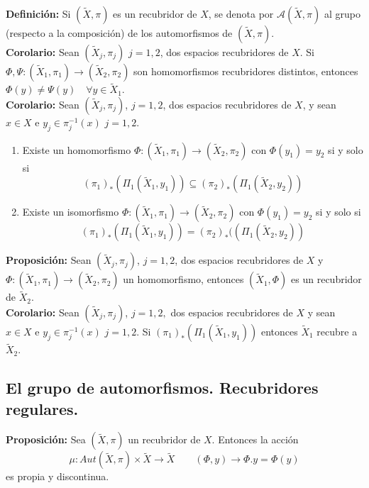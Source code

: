 \documentclass{article}
\begin{document}
\textbf{Definición:} Si $(\tilde{X},\pi)$ es un recubridor de $X$, se denota por $\mathcal{A}(\tilde{X},\pi)$ al grupo (respecto a la composición) de los automorfismos de $(\tilde{X},\pi)$.\\

\textbf{Corolario:} Sean $(\tilde{X}_j,\pi_j)$ $j=1,2$, dos espacios recubridores de $X$. Si $\Phi,\Psi:(\tilde{X}_1,\pi_1)\rightarrow (\tilde{X}_2,\pi_2)$ son homomorfismos recubridores distintos, entonces $\Phi(y)\neq \Psi(y)\quad \forall y\in \tilde{X}_1$.\\

\textbf{Corolario:} Sean $(\tilde{X}_j,\pi_j)$, $j=1,2$, dos espacios recubridores de $X$, y sean $x\in X$ e $y_j\in \pi_j^{-1}(x)$ $j=1,2$. 
\begin{enumerate}
\item Existe un homomorfismo $\Phi:(\tilde{X}_1,\pi_1)\rightarrow (\tilde{X}_2,\pi_2)$ con $\Phi(y_1)=y_2$ si y solo si
\begin{equation*}
(\pi_1)_*\left(\Pi_1(\tilde{X}_1,y_1)\right)\subseteq (\pi_2)_*\left(\Pi_1(\tilde{X}_2,y_2)\right)
\end{equation*}

\item Existe un isomorfismo $\Phi:(\tilde{X}_1,\pi_1)\rightarrow (\tilde{X}_2,\pi_2)$ con $\Phi(y_1)=y_2$ si y solo si
\begin{equation*}
(\pi_1)_*\left(\Pi_1(\tilde{X}_1,y_1)\right)=(\pi_2)_*(\left(\Pi_1(\tilde{X}_2,y_2)\right)
\end{equation*}
\end{enumerate}

\textbf{Proposición:} Sean $(\tilde{X}_j,\pi_j)$, $j=1,2$, dos espacios recubridores de $X$ y $\Phi:(\tilde{X}_1,\pi_1)\rightarrow (\tilde{X}_2,\pi_2)$ un homomorfismo, entonces $(\tilde{X}_1,\Phi)$ es un recubridor de $\tilde{X}_2$.\\

\textbf{Corolario:} Sean $(\tilde{X}_j,\pi_j)$, $j=1,2,$ dos espacios recubridores de $X$ y sean $x\in X$ e $y_j\in \pi_j^{-1}(x)$ $j=1,2$. Si $(\pi_1)_*\left(\Pi_1(\tilde{X}_1,y_1)\right)$ entonces $\tilde{X}_1$ recubre a $\tilde{X}_2$.

\subsection{El grupo de automorfismos. Recubridores regulares.}
\textbf{Proposición:} Sea $(\tilde{X},\pi)$ un recubridor de $X$. Entonces la acción
\begin{equation*}
\mu:Aut(\tilde{X},\pi)\times \tilde{X}\rightarrow \tilde{X}\qquad (\Phi,y)\rightarrow \Phi.y=\Phi(y)
\end{equation*}
es propia y discontinua.\\
\end{document}
